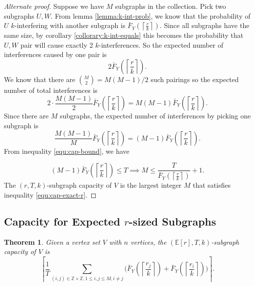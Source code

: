 \documentclass[10pt]{extarticle}
\newcommand{\Z}{\mathbb{Z}}
\newcommand{\E}{\mathbb{E}}
\newtheorem{theorem}{Theorem}
\theoremstyle{definition}
\begin{document}
\begin{proof}[Alternate proof]
    Suppose we have $M$ subgraphs in the collection. Pick two subgraphs $U,W$. From lemma \ref{lemma:k-int-prob}, we know that the probability of $U$ $k$-interfering with another subgraph is $\bar{F}_Y\left(\left\lceil \frac{r}{k} \right\rceil\right)$. Since all subgraphs have the same size, by corollary \ref{collorary:k-int-equals} this becomes the probability that $U,W$ pair will cause exactly 2 $k$-interferences. So the expected number of interferences caused by one pair is
    $$
    2\bar{F}_Y\left(\left\lceil \frac{r}{k} \right\rceil\right).
    $$
    We know that there are $\binom{M}{2} = M(M-1)/2$ such pairings so the expected number of total interferences is
    $$
    2 \cdot \frac{M(M-1)}{2} \bar{F}_Y\left(\left\lceil \frac{r}{k} \right\rceil\right)  =  M(M-1) \bar{F}_Y\left(\left\lceil \frac{r}{k} \right\rceil\right). 
    $$
    Since there are $M$ subgraphs, the expected number of interferences by picking one subgraph is
    $$
    \frac{M(M-1)}{M} \bar{F}_Y\left(\left\lceil \frac{r}{k} \right\rceil\right)  = (M-1) \bar{F}_Y\left(\left\lceil \frac{r}{k} \right\rceil\right).
    $$
    From inequality \ref{equ:cap-bound}, we have 

    \begin{equation*}
        (M-1) \bar{F}_Y\left(\left\lceil \frac{r}{k} \right\rceil\right) \le T \implies M \le \frac{T}{\bar{F}_Y\left(\left\lceil \frac{r}{k} \right\rceil\right)} + 1.
    \end{equation*}
The $(r,T,k)$-subgraph capacity of $V$ is the largest integer $M$ that satisfies inequality \ref{equ:cap-exact-r}.
\end{proof}

\subsection{Capacity for Expected $r$-sized Subgraphs}

\begin{theorem}
    Given a vertex set $V$ with $n$ vertices, the $(\E[r],T,k)$-subgraph capacity of $V$ is 
    \begin{equation*}
        \left\lceil \frac{1}{T}\sum_{(i,j) \in \Z\times\Z, 1 \le i,j \le M, i \ne j}  \Biggl( \bar{F}_Y\left(\left\lceil \frac{r_j}{k} \right\rceil\right) + \bar{F}_Y\left(\left\lceil \frac{r_i}{k} \right\rceil\right)\Biggr) \right\rceil.
    \end{equation*}
\end{theorem}
\end{document}
